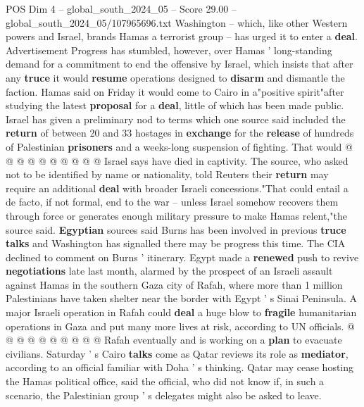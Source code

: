 \begin{textsample}{POS Dim 4 – global\_south\_2024\_05 – Score 29.00 – global\_south\_2024\_05/107965696.txt}
Washington -- which, like other Western powers and Israel, brands Hamas a terrorist group -- has urged it to enter a \textbf{deal}.
Advertisement Progress has stumbled, however, over Hamas ' long-standing demand for a commitment to end the offensive by Israel, which insists that after any \textbf{truce} it would \textbf{resume} operations designed to \textbf{disarm} and dismantle the faction.
Hamas said on Friday it would come to Cairo in a"positive spirit"after studying the latest \textbf{proposal} for a \textbf{deal}, little of which has been made public.
Israel has given a preliminary nod to terms which one source said included the \textbf{return} of between 20 and 33 hostages in \textbf{exchange} for the \textbf{release} of hundreds of Palestinian \textbf{prisoners} and a weeks-long suspension of fighting.
That would @ @ @ @ @ @ @ @ @ @ Israel says have died in captivity.
The source, who asked not to be identified by name or nationality, told Reuters their \textbf{return} may require an additional \textbf{deal} with broader Israeli concessions."That could entail a de facto, if not formal, end to the war -- unless Israel somehow recovers them through force or generates enough military pressure to make Hamas relent,"the source said. \textbf{Egyptian} sources said Burns has been involved in previous \textbf{truce} \textbf{talks} and Washington has signalled there may be progress this time.
The CIA declined to comment on Burns ' itinerary.
Egypt made a \textbf{renewed} push to revive \textbf{negotiations} late last month, alarmed by the prospect of an Israeli assault against Hamas in the southern Gaza city of Rafah, where more than 1 million Palestinians have taken shelter near the border with Egypt ' s Sinai Peninsula.
A major Israeli operation in Rafah could \textbf{deal} a huge blow to \textbf{fragile} humanitarian operations in Gaza and put many more lives at risk, according to UN officials. @ @ @ @ @ @ @ @ @ @ Rafah eventually and is working on a \textbf{plan} to evacuate civilians.
Saturday ' s Cairo \textbf{talks} come as Qatar reviews its role as \textbf{mediator}, according to an official familiar with Doha ' s thinking.
Qatar may cease hosting the Hamas political office, said the official, who did not know if, in such a scenario, the Palestinian group ' s delegates might also be asked to leave.

\end{textsample}
